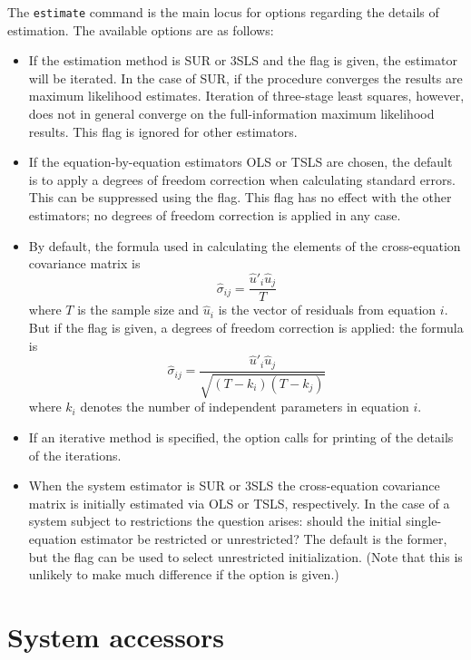 The \texttt{estimate} command is the main locus for options regarding
the details of estimation. The available options are as follows:

\begin{itemize}
\item If the estimation method is SUR or 3SLS and the 
  flag is given, the estimator will be iterated. In the case of SUR,
  if the procedure converges the results are maximum likelihood
  estimates. Iteration of three-stage least squares, however, does not
  in general converge on the full-information maximum likelihood
  results. This flag is ignored for other estimators.
\item If the equation-by-equation estimators OLS or TSLS are chosen,
  the default is to apply a degrees of freedom correction when
  calculating standard errors. This can be suppressed using the
   flag. This flag has no effect with the other
  estimators; no degrees of freedom correction is applied in any case.
\item By default, the formula used in calculating the elements of the
  cross-equation covariance matrix is
\[
\hat{\sigma}_{ij} = \frac{\hat{u}'_i \hat{u}_j}{T}
\]
where $T$ is the sample size and $\hat{u}_i$ is the vector of
residuals from equation $i$. But if the  flag is
given, a degrees of freedom correction is applied: the formula is
\[
\hat{\sigma}_{ij} = \frac{\hat{u}'_i \hat{u}_j}{\sqrt{(T-k_i)(T-k_j)}}
\]
where $k_i$ denotes the number of independent parameters in equation
$i$.
\item If an iterative method is specified, the  option
  calls for printing of the details of the iterations.
\item When the system estimator is SUR or 3SLS the cross-equation
  covariance matrix is initially estimated via OLS or TSLS,
  respectively. In the case of a system subject to restrictions the
  question arises: should the initial single-equation estimator be
  restricted or unrestricted? The default is the former, but the
   flag can be used to select unrestricted
  initialization. (Note that this is unlikely to make much difference
  if the  option is given.)
\end{itemize}

\section{System accessors}
\label{sec:sys-access}

